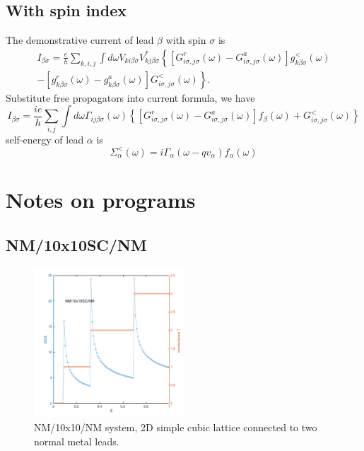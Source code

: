 \documentclass[aps,prb,superscriptaddress]{revtex4-2}
\begin{document}
\subsection{With spin index}
The demonstrative current of lead $\beta$ with spin $\sigma$ is~\cite{CaoZhan}
\begin{equation}
\begin{array}{r}
I_{\beta \sigma}=\frac{e}{h} \sum_{k, i, j} \int d \omega V_{k i \beta \sigma} V_{k j \beta \sigma}^{*}\left\{\left[G_{i \sigma, j \sigma}^{r}(\omega)-G_{i \sigma, j \sigma}^{a}(\omega)\right] g_{k \beta \sigma}^{<}(\omega)\right. \\
\left.-\left[g_{k \beta \sigma}^{r}(\omega)-g_{k \beta \sigma}^{a}(\omega)\right] G_{i \sigma, j \sigma}^{<}(\omega)\right\}.
\end{array}
\end{equation}
Substitute free propagators into current formula, we have
\begin{equation}
I_{\beta \sigma}=\frac{i e}{h} \sum_{i, j} \int d \omega \Gamma_{i j \beta \sigma}(\omega)\left\{\left[G_{i \sigma, j \sigma}^{r}(\omega)-G_{i \sigma, j \sigma}^{a}(\omega)\right] f_{\beta}(\omega)+G_{i \sigma, j \sigma}^{<}(\omega)\right\}
\end{equation}
self-energy of lead $\alpha$ is
\begin{equation}
\Sigma_{\alpha}^{<}(\omega)=i \Gamma_{\alpha}\left(\omega-q v_{\alpha}\right) f_{\alpha}(\omega)
\end{equation}
\section{Notes on programs}
\subsection{NM/10x10SC/NM}
\begin{figure}[htp!]
\centering
\includegraphics[width=0.5\textwidth, height=0.4\textwidth]{figures/DOST-E.pdf}
\caption{NM/10x10/NM system, 2D simple cubic lattice connected to two normal metal leads.}
\end{figure}
\end{document}
